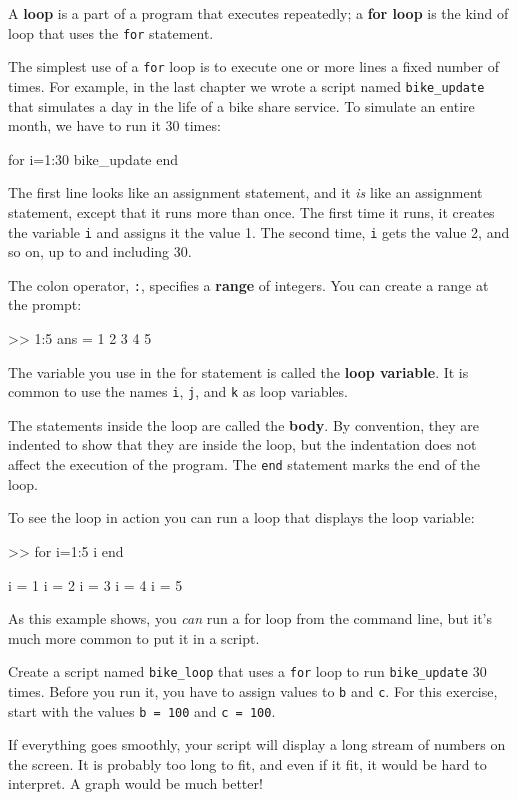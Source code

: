\documentclass[
]{book}
\numberwithin{Answer}{chapter}
\numberwithin{Exercise}{chapter}
\begin{document}
A {\bf loop} is a part of a program that executes repeatedly;
a {\bf for loop} is the kind of loop that uses the {\tt for}
statement.

The simplest use of a {\tt for} loop is to execute one or more
lines a fixed number of times.
For example, in the last chapter
we wrote a script named \verb"bike_update" that simulates a
day in the life of a bike share service.  To simulate an entire
month, we have to run it 30 times:

\begin{code}
for i=1:30
    bike_update
end
\end{code}

The first line looks like an assignment statement, and it {\em is}
like an assignment statement, except that it runs more than once.  The
first time it runs, it creates the variable {\tt i} and assigns it the
value 1.  The second time, {\tt i} gets the value 2, and so on, up to
and including 30.

The colon operator, {\tt :}, specifies a {\bf range} of integers.  You can create a range at the prompt:

\begin{code}
>> 1:5
ans =  1     2     3     4     5
\end{code}

The variable you use in the for statement is called the {\bf loop
variable}.  It is common to use the names {\tt i},
{\tt j}, and {\tt k} as loop variables.

The statements inside the loop are called the {\bf body}.  By convention,
they are indented to show that they are inside the loop, but the
indentation does not affect the execution of the program.
The {\tt end} statement marks the end of the loop.

To see the loop in action you can run a loop that displays the
loop variable:

\begin{code}
>> for i=1:5
    i
end

i = 1
i = 2
i = 3
i = 4
i = 5
\end{code}

As this example shows, you {\em can} run a for loop from the
command line, but it's much more common to put it in a script.

\begin{ex}
Create a script named \verb"bike_loop" that uses a {\tt for} loop to run \verb"bike_update" 30 times.  Before you run it, you have to assign values to {\tt b} and {\tt c}.
For this exercise, start with the values {\tt b = 100} and {\tt c = 100}.

If everything goes smoothly, your script will display a long stream
of numbers on the screen.  It is probably too long
to fit, and even if it fit, it would be hard to interpret.
A graph would be much better!
\end{ex}
\end{document}
